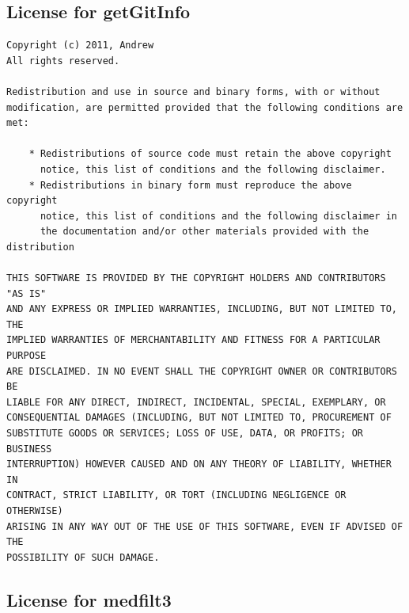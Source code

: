 \documentclass[a4paper, oneside, onecolumn, 11pt]{article}
\begin{document}
\subsection{License for getGitInfo}

\begingroup
\footnotesize
\begin{verbatim}
Copyright (c) 2011, Andrew
All rights reserved.

Redistribution and use in source and binary forms, with or without
modification, are permitted provided that the following conditions are
met:

    * Redistributions of source code must retain the above copyright
      notice, this list of conditions and the following disclaimer.
    * Redistributions in binary form must reproduce the above copyright
      notice, this list of conditions and the following disclaimer in
      the documentation and/or other materials provided with the distribution

THIS SOFTWARE IS PROVIDED BY THE COPYRIGHT HOLDERS AND CONTRIBUTORS "AS IS"
AND ANY EXPRESS OR IMPLIED WARRANTIES, INCLUDING, BUT NOT LIMITED TO, THE
IMPLIED WARRANTIES OF MERCHANTABILITY AND FITNESS FOR A PARTICULAR PURPOSE
ARE DISCLAIMED. IN NO EVENT SHALL THE COPYRIGHT OWNER OR CONTRIBUTORS BE
LIABLE FOR ANY DIRECT, INDIRECT, INCIDENTAL, SPECIAL, EXEMPLARY, OR
CONSEQUENTIAL DAMAGES (INCLUDING, BUT NOT LIMITED TO, PROCUREMENT OF
SUBSTITUTE GOODS OR SERVICES; LOSS OF USE, DATA, OR PROFITS; OR BUSINESS
INTERRUPTION) HOWEVER CAUSED AND ON ANY THEORY OF LIABILITY, WHETHER IN
CONTRACT, STRICT LIABILITY, OR TORT (INCLUDING NEGLIGENCE OR OTHERWISE)
ARISING IN ANY WAY OUT OF THE USE OF THIS SOFTWARE, EVEN IF ADVISED OF THE
POSSIBILITY OF SUCH DAMAGE.
\end{verbatim}
\endgroup

\subsection{License for medfilt3}
\end{document}
